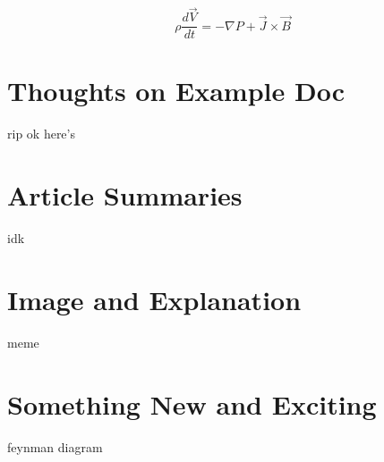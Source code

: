 \documentclass[12pt, letterpaper]{article}
\begin{document}
\begin{equation}
  \label{eq:1}
  \rho \frac{d \vec{V}}{dt} = - \nabla P + \vec{J} \times \vec{B}
\end{equation}

\section{Thoughts on Example Doc}


rip ok here's \cite[]{Dimmock2020,Hietala2012,Lopez2010}


\section{Article Summaries}


idk


\section{Image and Explanation}


meme


\section{Something New and Exciting}


feynman diagram


\clearpage
{}



\end{document}
